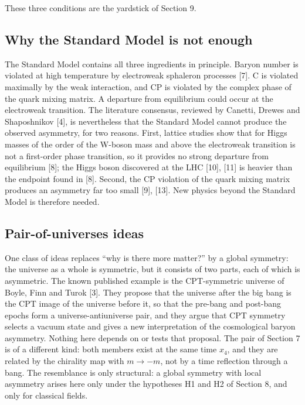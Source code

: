 \documentclass[11pt]{article}
\begin{document}
These three conditions are the yardstick of Section 9.

\subsection{Why the Standard Model is not enough}

The Standard Model contains all three ingredients in principle. Baryon number is violated at high temperature by electroweak sphaleron processes [7]. C is violated maximally by the weak interaction, and CP is violated by the complex phase of the quark mixing matrix. A departure from equilibrium could occur at the electroweak transition. The literature consensus, reviewed by Canetti, Drewes and Shaposhnikov [4], is nevertheless that the Standard Model cannot produce the observed asymmetry, for two reasons. First, lattice studies show that for Higgs masses of the order of the W-boson mass and above the electroweak transition is not a first-order phase transition, so it provides no strong departure from equilibrium [8]; the Higgs boson discovered at the LHC [10], [11] is heavier than the endpoint found in [8]. Second, the CP violation of the quark mixing matrix produces an asymmetry far too small [9], [13]. New physics beyond the Standard Model is therefore needed.

\subsection{Pair-of-universes ideas}

One class of ideas replaces ``why is there more matter?'' by a global symmetry: the universe as a whole is symmetric, but it consists of two parts, each of which is asymmetric. The known published example is the CPT-symmetric universe of Boyle, Finn and Turok [3]. They propose that the universe after the big bang is the CPT image of the universe before it, so that the pre-bang and post-bang epochs form a universe-antiuniverse pair, and they argue that CPT symmetry selects a vacuum state and gives a new interpretation of the cosmological baryon asymmetry. Nothing here depends on or tests that proposal. The pair of Section 7 is of a different kind: both members exist at the same time $x_4$, and they are related by the chirality map with $m\to-m$, not by a time reflection through a bang. The resemblance is only structural: a global symmetry with local asymmetry arises here only under the hypotheses H1 and H2 of Section 8, and only for classical fields.
\end{document}
